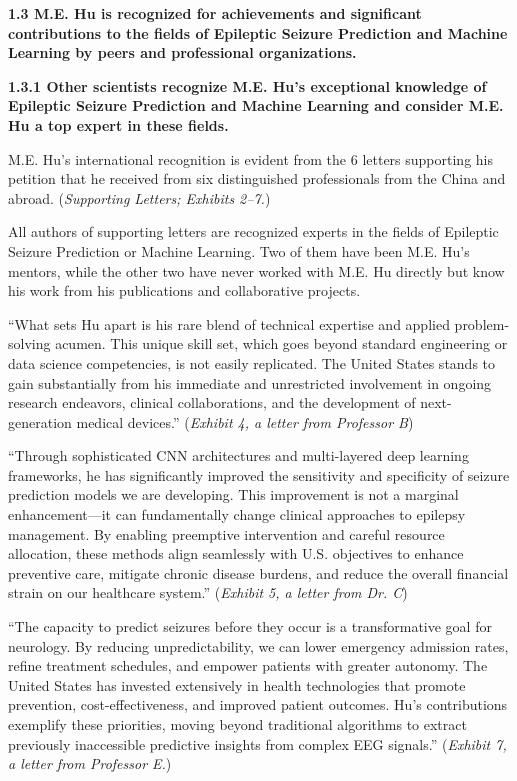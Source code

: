 \documentclass{article}
\begin{document}
{\bf 1.3 M.E. Hu is recognized for achievements and significant contributions to the fields of Epileptic Seizure Prediction and Machine Learning by peers and professional organizations. }

{\bf 1.3.1 Other scientists recognize M.E. Hu’s exceptional knowledge of Epileptic Seizure Prediction and Machine Learning and consider M.E. Hu a top expert in these fields.}

M.E. Hu's international recognition is evident from the 6 letters supporting his petition that he received from six distinguished professionals from the China and abroad. ({\it Supporting Letters; Exhibits 2–7.}) 

All authors of supporting letters are recognized experts in the fields of Epileptic Seizure Prediction or Machine Learning. Two of them have been M.E. Hu’s mentors, while the other two have never worked with M.E. Hu directly but know his work from his publications and collaborative projects. 

“What sets Hu apart is his rare blend of technical expertise and applied problem-solving acumen. This unique skill set, which goes beyond standard engineering or data science competencies, is not easily replicated. The United States stands to gain substantially from his immediate and unrestricted involvement in ongoing research endeavors, clinical collaborations, and the development of next-generation medical devices.” ({\it Exhibit 4, a letter from Professor B})

“Through sophisticated CNN architectures and multi-layered deep learning frameworks, he has significantly improved the sensitivity and specificity of seizure prediction models we are developing. This improvement is not a marginal enhancement—it can fundamentally change clinical approaches to epilepsy management. By enabling preemptive intervention and careful resource allocation, these methods align seamlessly with U.S. objectives to enhance preventive care, mitigate chronic disease burdens, and reduce the overall financial strain on our healthcare system.” ({\it Exhibit 5, a letter from Dr. C})

“The capacity to predict seizures before they occur is a transformative goal for neurology. By reducing unpredictability, we can lower emergency admission rates, refine treatment schedules, and empower patients with greater autonomy. The United States has invested extensively in health technologies that promote prevention, cost-effectiveness, and improved patient outcomes. Hu’s contributions exemplify these priorities, moving beyond traditional algorithms to extract previously inaccessible predictive insights from complex EEG signals.” ({\it Exhibit 7, a letter from Professor E.})
\end{document}
